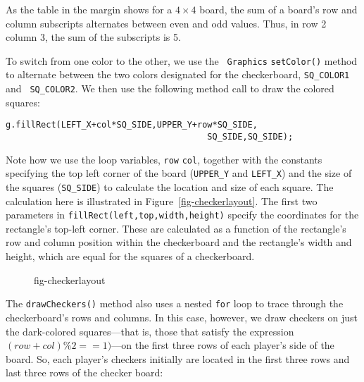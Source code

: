 As the table in the margin shows for a $4 \times 4$ board, the sum of
a board's row and column subscripts alternates between even and odd
values. Thus, in row 2 column 3, the sum of the subscripts is 5.


To switch from one color to the other, we use the {\tt
Graphics} {\tt setColor()} method to alternate between the two colors
designated for the checkerboard, {\tt SQ\_COLOR1} and {\tt
SQ\_COLOR2}.  We then use the following method call to draw the
colored squares:

\begin{jjjlisting}
\begin{lstlisting}
g.fillRect(LEFT_X+col*SQ_SIDE,UPPER_Y+row*SQ_SIDE,
                                        SQ_SIDE,SQ_SIDE);
\end{lstlisting}
\end{jjjlisting}

\noindent Note how we use the loop variables, {\tt row} {\tt col},
together with the constants specifying the top left corner of the
board ({\tt UPPER\_Y} and {\tt LEFT\_X}) and the size of the squares
({\tt SQ\_SIDE}) to calculate the location and size of each square.
The calculation here is illustrated in Figure~\ref{fig-checkerlayout}.
The first two parameters in {\tt fillRect(left,top,width,height)}
specify the coordinates for the rectangle's top-left corner. These
are calculated as a function of the rectangle's row and column
position within the checkerboard and the rectangle's width and
height, which are equal for the squares of a checkerboard.

\begin{figure}[hbt]
 {fig-checkerlayout}

\end{figure}

The {\tt drawCheckers()} method also uses a nested {\tt for} loop to
trace through the checkerboard's rows and columns. In this case,
however, we draw checkers on just the dark-colored squares---that is,
those that satisfy the expression $(row+col) \% 2 == 1)$---on the
first three rows of each player's side of the board. So, each player's
checkers initially are located in the first three rows and last three
rows of the checker board:

